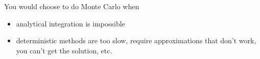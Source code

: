 \documentclass[12pt]{article}
\begin{document}
You would choose to do Monte Carlo when 
\begin{itemize}
\item analytical integration is impossible
\item deterministic methods are too slow, require approximations that don't work, you can't get the solution, etc.
\end{itemize} 



\end{document}
